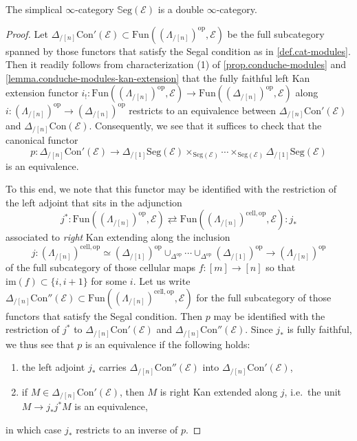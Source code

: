\documentclass[a4paper, 11pt]{amsart}
\numberwithin{theorem}{section}
\theoremstyle{definition}
\newcommand{\op}{\mathrm{op}}
\newcommand{\im}{\mathrm{im}}
\newcommand{\fun}{\mathrm{Fun}}
\newcommand{\E}{\mathscr{E}}
\newcommand{\Seg}{\mathrm{Seg}}
\newcommand{\Con}{\mathrm{Con}}
\newcommand{\SSEG}{\mathbb{S}\mathrm{eg}}
\begin{document}
\begin{proposition}\label{prop.double-infty-cat-cat-objs}
	The simplical $\infty$-category $\SSEG(\E)$ is a double $\infty$-category.
\end{proposition}
\begin{proof}
	Let $\Delta_{/[n]}\Con'(\E) \subset \fun((\Lambda_{/[n]})^\op, \E)$ be the full subcategory spanned 
	by those functors that satisfy the Segal condition as in \cref{def.cat-modules}.
	Then it readily 
	follows from characterization (1) of \cref{prop.conduche-modules} and \cref{lemma.conduche-modules-kan-extension} that the fully faithful left Kan extension functor 
	$
	i_!: \fun((\Lambda_{/[n]})^\op, \E) \rightarrow \fun((\Delta_{/[n]})^\op, \E)
	$
	along $i : (\Lambda_{/[n]})^\op \rightarrow (\Delta_{/[n]})^\op$
	restricts to an equivalence between $\Delta_{/[n]}\Con'(\E)$ and $\Delta_{/[n]}\Con(\E)$. Consequently, 
	we see that it suffices to check that the canonical functor 
	$$
	p : \Delta_{/[n]}\Con'(\E) \rightarrow {\Delta_{/[1]}}\Seg(\E) \times_{\Seg(\E)} \dotsb \times_{\Seg(\E)} {\Delta_{/[1]}}\Seg(\E)
	$$
	is an equivalence.

	To this end, we note that this functor may be identified with the restriction of the left adjoint 
	that sits in the adjunction
	$$
	j^* : \fun((\Lambda_{/[n]})^\op, \E) \rightleftarrows \fun((\Lambda_{/[n]})^{\mathrm{cell}, \op},\E)  : j_*
	$$
	associated to \textit{right} Kan extending along the inclusion
	$$j : (\Lambda_{/[n]})^{\mathrm{cell},\op} \simeq (\Delta_{/[1]})^\op \cup_{\Delta^\op} \dotsb \cup_{\Delta^\op} (\Delta_{/[1]})^\op \rightarrow (\Lambda_{/[n]})^\op$$
	of the full subcategory of those cellular maps $f : [m] \rightarrow [n]$ so that $\im(f) \subset \{i,i+1\}$ for some $i$. 
	Let us write $\Delta_{/[n]}\Con''(\E) \subset \fun((\Lambda_{/[n]})^{\mathrm{cell}, \op},\E)$ for the full subcategory of 
	those functors that satisfy the Segal condition. Then $p$ may be identified with the restriction of $j^*$ 
	to $\Delta_{/[n]}\Con'(\E)$ and $\Delta_{/[n]}\Con''(\E)$. 
	Since $j_*$ is fully faithful, we thus see that $p$ is an equivalence if the following holds:
	\begin{enumerate}
		\item the left adjoint $j_*$ carries $\Delta_{/[n]}\Con''(\E)$ into $\Delta_{/[n]}\Con'(\E)$,
		\item if $M \in \Delta_{/[n]}\Con'(\E)$, then $M$ is right Kan extended along $j$, i.e.\, the unit
		$M \rightarrow j_*j^*M$ is an equivalence,
	\end{enumerate}
	in which case $j_*$ restricts to an inverse of $p$. 
	

\end{proof}
\end{document}
